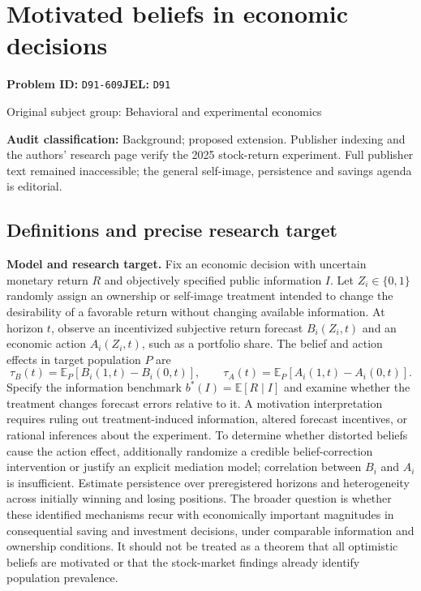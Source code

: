 \documentclass[11pt,a4paper]{article}
\begin{document}
\section*{Motivated beliefs in economic decisions}
\textbf{Problem ID:} \texttt{D91-609}\quad \textbf{JEL:} \texttt{D91}\par
\label{problem:OP-0305}
{\sffamily\small\color{muted}Original subject group: Behavioral and experimental economics\par}
\label{definitions:problem:30007587}
\textbf{Audit classification:} Background; proposed extension. Publisher indexing and the authors’ research page verify the 2025 stock-return experiment. Full publisher text remained inaccessible; the general self-image, persistence and savings agenda is editorial.
\subsection*{Definitions and precise research target}
\textbf{Model and research target.} Fix an economic decision with uncertain monetary return \(R\) and objectively specified public information \(I\). Let \(Z_i\in\{0,1\}\) randomly assign an ownership or self-image treatment intended to change the desirability of a favorable return without changing available information. At horizon \(t\), observe an incentivized subjective return forecast \(B_i(Z_i,t)\) and an economic action \(A_i(Z_i,t)\), such as a portfolio share. The belief and action effects in target population \(P\) are
\[\tau_B(t)=\mathbb E_P[B_i(1,t)-B_i(0,t)],\qquad \tau_A(t)=\mathbb E_P[A_i(1,t)-A_i(0,t)].\]
Specify the information benchmark \(b^*(I)=\mathbb E[R\mid I]\) and examine whether the treatment changes forecast errors relative to it. A motivation interpretation requires ruling out treatment-induced information, altered forecast incentives, or rational inferences about the experiment. To determine whether distorted beliefs cause the action effect, additionally randomize a credible belief-correction intervention or justify an explicit mediation model; correlation between \(B_i\) and \(A_i\) is insufficient. Estimate persistence over preregistered horizons and heterogeneity across initially winning and losing positions. The broader question is whether these identified mechanisms recur with economically important magnitudes in consequential saving and investment decisions, under comparable information and ownership conditions. It should not be treated as a theorem that all optimistic beliefs are motivated or that the stock-market findings already identify population prevalence.
\end{document}
